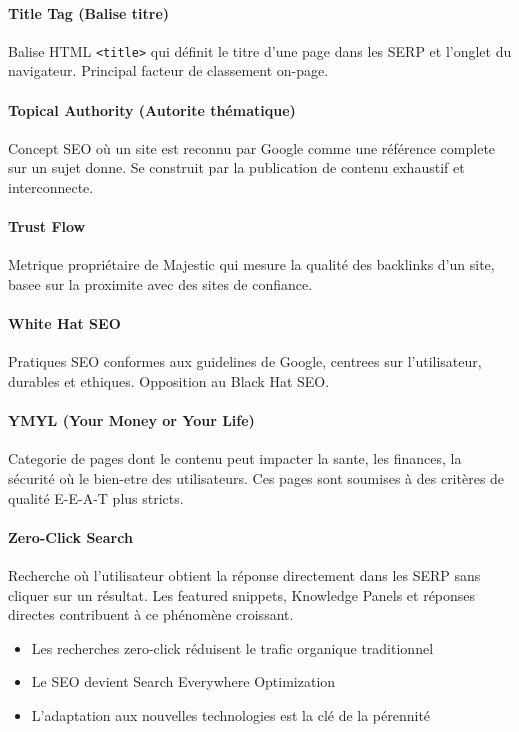 \documentclass[12pt,a4paper,twoside]{report}
\begin{document}
\paragraph*{Title Tag (Balise titre)}
Balise HTML \texttt{<title>} qui définit le titre d'une page dans les SERP et l'onglet du navigateur. Principal facteur de classement on-page.

\paragraph*{Topical Authority (Autorite thématique)}
Concept SEO où un site est reconnu par Google comme une référence complete sur un sujet donne. Se construit par la publication de contenu exhaustif et interconnecte.

\paragraph*{Trust Flow}
Metrique propriétaire de Majestic qui mesure la qualité des backlinks d'un site, basee sur la proximite avec des sites de confiance.

\paragraph*{White Hat SEO}
Pratiques SEO conformes aux guidelines de Google, centrees sur l'utilisateur, durables et ethiques. Opposition au Black Hat SEO.

\paragraph*{YMYL (Your Money or Your Life)}
Categorie de pages dont le contenu peut impacter la sante, les finances, la sécurité où le bien-etre des utilisateurs. Ces pages sont soumises à des critères de qualité E-E-A-T plus stricts.

\paragraph*{Zero-Click Search}
Recherche où l'utilisateur obtient la réponse directement dans les SERP sans cliquer sur un résultat. Les featured snippets, Knowledge Panels et réponses directes contribuent à ce phénomène croissant.

\begin{takeaways}
\begin{itemize}
    \item Les recherches zero-click réduisent le trafic organique traditionnel
    \item Le SEO devient Search Everywhere Optimization
    \item L'adaptation aux nouvelles technologies est la clé de la pérennité
\end{itemize}
\end{takeaways}
\end{document}
